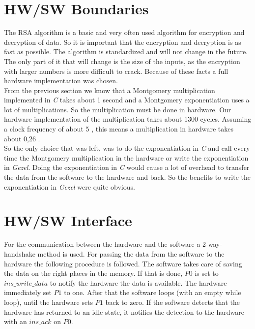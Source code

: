 \documentclass[a4paper]{article}
\begin{document}
\section{HW/SW Boundaries}

The RSA algorithm is a basic and very often used algorithm for encryption and decryption of data. So it is important that the encryption and decryption is as fast as possible. The algorithm is standardized and will not change in the future. The only part of it that will change is the size of the inputs, as the encryption with larger numbers is more difficult to crack. Because of these facts a full hardware implementation was chosen.\\

From the previous section we know that a Montgomery multiplication implemented in \textit{C} takes about 1 second and a Montgomery exponentiation uses a lot of multiplications. So the multiplication must be done in hardware. Our hardware implementation of the multiplication takes about 1300 cycles. Assuming a clock frequency of about 5 \mega \hertz, this means a multiplication in hardware takes about 0,26 \micro \second.\\

So the only choice that was left, was to do the exponentiation in \textit{C} and call every time the Montgomery multiplication in the hardware or write the exponentiation in \textit{Gezel}. Doing the exponentiation in \textit{C} would cause a lot of overhead to transfer the data from the software to the hardware and back. So the benefits to write the exponentiation in \textit{Gezel} were quite obvious.

\section{HW/SW Interface}

For the communication between the hardware and the software a 2-way-handshake method is used. For passing the data from the software to the hardware the following procedure is followed. The software takes care of saving the data on the right places in the memory. If that is done, $P0$ is set to $ins\_write\_data$ to notify the hardware the data is available. The hardware immediately set $P1$ to one. After that the software loops (with an empty while loop), until the hardware sets $P1$ back to zero. If the software detects that the hardware has returned to an idle state, it notifies the detection to the hardware with an $ins\_ack$ on $P0$.\\
\end{document}
